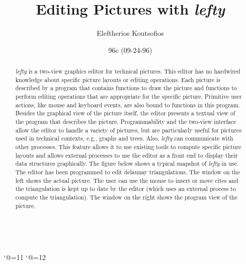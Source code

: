 

\catcode`@=11
\def\@makechapterhead#1{
    {
        \parindent \z@ \raggedright \reset@font
        \ifnum \c@secnumdepth >\m@ne
            \Large\bfseries \@chapapp{} \thechapter . #1
            \par\nobreak
            \vskip 20\p@
        \fi
        \interlinepenalty\@M
    }
}
\catcode`@=12

\newcommand{\DOT}{{\sl dot}}
\newcommand{\LEFTY}{{\sl lefty}}
\newcommand{\DOTTY}{{\sl dotty}}

\title{Editing Pictures with {\LEFTY}}
\author{Eleftherios Koutsofios}
\newcommand{\lastedited}{96c (09-24-96)}
\date{\lastedited}

\renewcommand{\textfraction}{0.01}
\setlength\oddsidemargin{0.00pt}
\setlength\evensidemargin{0.00pt}
\setlength{\topmargin}{0pt}
\setlength{\headheight}{0pt}
\setlength{\headsep}{0pt}
\setlength{\textheight}{8.5in}
\setlength{\textwidth}{6.5in}

\maketitle
\begin{abstract}
{\LEFTY} is a two-view graphics editor for technical pictures. This editor has
no hardwired knowledge about specific picture layouts or editing operations.
Each picture is described by a program that contains functions to draw the
picture and functions to perform editing operations that are appropriate for
the specific picture. Primitive user actions, like mouse and keyboard events,
are also bound to functions in this program. Besides the graphical view of the
picture itself, the editor presents a textual view of the program that
describes the picture. Programmability and the two-view interface allow the
editor to handle a variety of pictures, but are particularly useful for
pictures used in technical contexts, e.g., graphs and trees. Also, {\LEFTY} can
communicate with other processes. This feature allows it to use existing tools
to compute specific picture layouts and allows external processes to use the
editor as a front end to display their data structures graphically. The figure
below shows a typical snapshot of {\LEFTY} in use. The editor has been
programmed to edit delaunay triangulations. The window on the left shows the
actual picture.  The user can use the mouse to insert or move cites and the
triangulation is kept up to date by the editor (which uses an external process
to compute the triangulation).  The window on the right shows the program view
of the picture.

\vspace{0.1in}
\centerline{\hbox{\epsfxsize=5.5in }}
\end{abstract}



